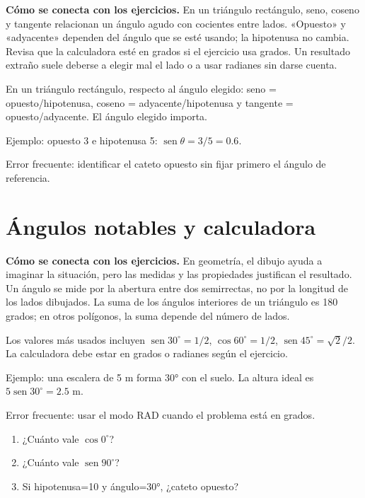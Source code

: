 \documentclass[10pt,oneside,openany]{book}
\newcommand{\sen}{\operatorname{sen}}\newcommand{\Prob}{\operatorname{P}}
\begin{document}
\textbf{Cómo se conecta con los ejercicios.} En un triángulo rectángulo, seno, coseno y tangente relacionan un ángulo agudo con cocientes entre lados. «Opuesto» y «adyacente» dependen del ángulo que se esté usando; la hipotenusa no cambia. Revisa que la calculadora esté en grados si el ejercicio usa grados. Un resultado extraño suele deberse a elegir mal el lado o a usar radianes sin darse cuenta.

En un triángulo rectángulo, respecto al ángulo elegido: seno = opuesto/hipotenusa, coseno = adyacente/hipotenusa y tangente = opuesto/adyacente. El ángulo elegido importa.



\begin{ejemplo}
Ejemplo: opuesto 3 e hipotenusa 5: $\sen\theta=3/5=0.6$.
\end{ejemplo}

\begin{ojo}
Error frecuente: identificar el cateto opuesto sin fijar primero el ángulo de referencia.
\end{ojo}



\section{Ángulos notables y calculadora}

\textbf{Cómo se conecta con los ejercicios.} En geometría, el dibujo ayuda a imaginar la situación, pero las medidas y las propiedades justifican el resultado. Un ángulo se mide por la abertura entre dos semirrectas, no por la longitud de los lados dibujados. La suma de los ángulos interiores de un triángulo es 180 grados; en otros polígonos, la suma depende del número de lados.

Los valores más usados incluyen $\sen30^\circ=1/2$, $\cos60^\circ=1/2$, $\sen45^\circ=\sqrt2/2$. La calculadora debe estar en grados o radianes según el ejercicio.

\begin{ejemplo}
Ejemplo: una escalera de 5 m forma 30° con el suelo. La altura ideal es $5\sen30^\circ=2.5$ m.
\end{ejemplo}

\begin{ojo}
Error frecuente: usar el modo RAD cuando el problema está en grados.
\end{ojo}

\begin{practica}

\begin{enumerate}

\item ¿Cuánto vale $\cos 0^\circ$?

\item ¿Cuánto vale $\sen90^\circ$?

\item Si hipotenusa=10 y ángulo=30°, ¿cateto opuesto?

\end{enumerate}

\end{practica}
\end{document}
